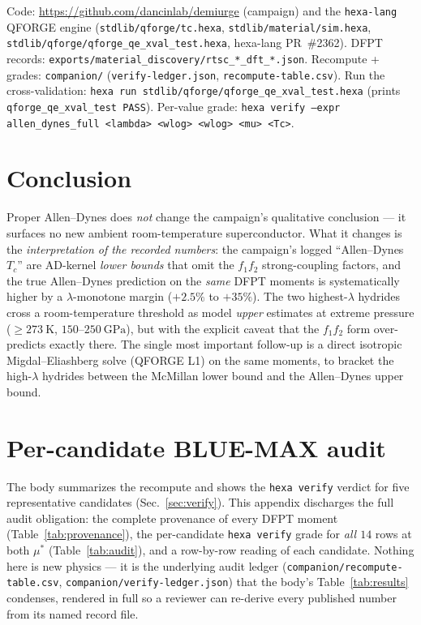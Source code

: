 \documentclass[11pt,a4paper]{article}
\begin{document}
Code: \url{https://github.com/dancinlab/demiurge} (campaign) and the
\texttt{hexa-lang} QFORGE engine
(\texttt{stdlib/qforge/tc.hexa}, \texttt{stdlib/material/sim.hexa},
\texttt{stdlib/qforge/qforge\_qe\_xval\_test.hexa}, hexa-lang PR~\#2362).
DFPT records: \texttt{exports/material\_discovery/rtsc\_*\_dft\_*.json}.
Recompute + grades: \texttt{companion/} (\texttt{verify-ledger.json},
\texttt{recompute-table.csv}). Run the cross-validation:
\texttt{hexa run stdlib/qforge/qforge\_qe\_xval\_test.hexa} (prints
\texttt{qforge\_qe\_xval\_test PASS}). Per-value grade:
\texttt{hexa verify --expr allen\_dynes\_full <lambda> <wlog> <wlog> <mu> <Tc>}.

\section{Conclusion}
\label{sec:conclusion}

Proper Allen--Dynes does \emph{not} change the campaign's qualitative
conclusion --- it surfaces no new ambient room-temperature superconductor.
What it changes is the \emph{interpretation of the recorded numbers}: the
campaign's logged ``Allen--Dynes $T_c$'' are AD-kernel \emph{lower bounds} that
omit the $f_1 f_2$ strong-coupling factors, and the true Allen--Dynes prediction
on the \emph{same} DFPT moments is systematically higher by a $\lambda$-monotone
margin ($+2.5\%$ to $+35\%$). The two highest-$\lambda$ hydrides cross a
room-temperature threshold as model \emph{upper} estimates at extreme pressure
($\ge\SI{273}{\kelvin}$, $150$--$\SI{250}{\giga\pascal}$), but with the explicit
caveat that the $f_1 f_2$ form over-predicts exactly there. The single most
important follow-up is a direct isotropic Migdal--Eliashberg solve (QFORGE L1)
on the same moments, to bracket the high-$\lambda$ hydrides between the McMillan
lower bound and the Allen--Dynes upper bound.

\appendix

\section{Per-candidate BLUE-MAX audit}
\label{app:audit}

The body summarizes the recompute and shows the \texttt{hexa verify} verdict for
five representative candidates (Sec.~\ref{sec:verify}). This appendix discharges
the full audit obligation: the complete provenance of every DFPT moment
(Table~\ref{tab:provenance}), the per-candidate \texttt{hexa verify} grade for
\emph{all $14$} rows at both $\mu^*$ (Table~\ref{tab:audit}), and a row-by-row
reading of each candidate. Nothing here is new physics --- it is the underlying
audit ledger (\texttt{companion/recompute-table.csv},
\texttt{companion/verify-ledger.json}) that the body's Table~\ref{tab:results}
condenses, rendered in full so a reviewer can re-derive every published number
from its named record file.
\end{document}
